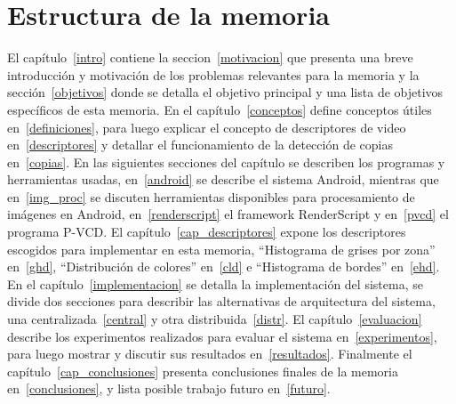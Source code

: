 \section{Estructura de la memoria}
El capítulo~\ref{intro} contiene la seccion~\ref{motivacion} que presenta una breve introducción y motivación de los problemas relevantes para la memoria y la sección~\ref{objetivos} donde se detalla el objetivo principal y una lista de objetivos específicos de esta memoria. En el capítulo~\ref{conceptos} define conceptos útiles en~\ref{definiciones}, para luego explicar el concepto de descriptores de video en~\ref{descriptores} y detallar el funcionamiento de la detección de copias en~\ref{copias}. En las siguientes secciones del capítulo se describen los programas y herramientas usadas, en~\ref{android} se describe el sistema Android, mientras que en~\ref{img_proc} se discuten herramientas disponibles para procesamiento de imágenes en Android, en~\ref{renderscript} el framework RenderScript y en~\ref{pvcd} el programa P-VCD.
El capítulo~\ref{cap_descriptores} expone los descriptores escogidos para implementar en esta memoria, ``Histograma de grises por zona'' en~\ref{ghd}, ``Distribución de colores'' en~\ref{cld} e ``Histograma de bordes'' en~\ref{ehd}.
En el capítulo~\ref{implementacion} se detalla la implementación del sistema, se divide dos secciones para describir las alternativas de arquitectura del sistema, una centralizada~\ref{central} y otra distribuida~\ref{distr}.
El capítulo~\ref{evaluacion} describe los experimentos realizados para evaluar el sistema en~\ref{experimentos}, para luego mostrar y discutir sus resultados en~\ref{resultados}.
Finalmente el capítulo~\ref{cap_conclusiones} presenta conclusiones finales de la memoria en~\ref{conclusiones}, y lista posible trabajo futuro en~\ref{futuro}.

